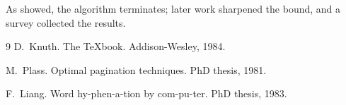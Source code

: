 \documentclass{article}
\begin{document}
As \citet{knuth1984} showed, the algorithm terminates; later work
\citep{plass1981} sharpened the bound, and a survey \citep[see][p.~14]{liang1983}
collected the results.

\begin{thebibliography}{9}
D.~Knuth.
\newblock The \TeX book.
\newblock Addison-Wesley, 1984.

M.~Plass.
\newblock Optimal pagination techniques.
\newblock PhD thesis, 1981.

F.~Liang.
\newblock Word hy-phen-a-tion by com-pu-ter.
\newblock PhD thesis, 1983.
\end{thebibliography}
\end{document}
